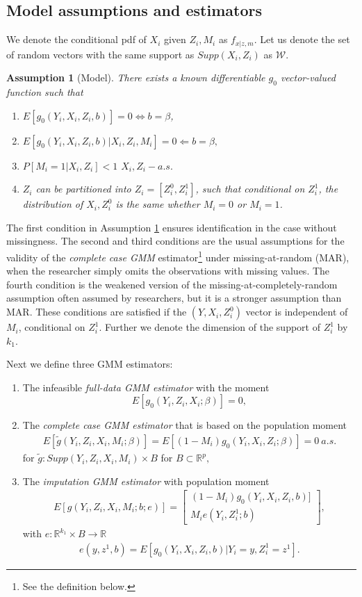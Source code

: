 \documentclass{article}
\newtheorem{assumption}{Assumption}
\theoremstyle{definition}
\theoremstyle{remark}
\begin{document}
\subsection{Model assumptions and estimators}
We denote the conditional pdf of $X_i$ given $Z_i, M_i$ as $f_{x|z,m}$. Let us denote the set of random vectors with the same support as $Supp(X_i,Z_i)$ as $\mathcal{W}$.
\begin{assumption}[Model] \label{ass_model}
There exists a known differentiable $g_0$ vector-valued function such that
\begin{enumerate}
\item $E[g_0(Y_i,X_i, Z_i, b)] = 0 \iff b=\beta$,
\item $E[g_0(Y_i, X_i, Z_i, b)|X_i, Z_i, M_i] = 0 \Leftarrow b=\beta,$
\item $P[M_i=1|X_i,Z_i]<1$ $X_i,Z_i-a.s.$
\item $Z_i$ can be partitioned into $Z_i= [Z^0_i, Z^1_i]$, such that conditional on $Z_i^1$, the distribution of $X_i, Z^0_i$ is the same whether $M_i=0$ or $M_i=1$.
\end{enumerate}
\end{assumption}
The first condition in Assumption \ref{ass_model} ensures identification in the case without missingness. The second and third conditions are the usual assumptions for the validity of the \textit{complete case GMM} estimator\footnote{See the definition below.} under missing-at-random (MAR), when the researcher simply omits the observations with missing values. The fourth condition is the weakened version of the missing-at-completely-random assumption often assumed by researchers, but it is a stronger assumption than MAR. These conditions are satisfied if the $(Y,X_i,Z^0_i)$ vector is independent of $M_i$, conditional on $Z_i^1$. Further we denote the dimension of the support of $Z^1_i$ by $k_1$.

Next we define three GMM estimators: 
\begin{enumerate}
	\item The infeasible \emph{full-data GMM estimator} with the moment
	\[E[g_0(Y_i, Z_i, X_i; \beta)]=0,
	\]
	\item The \emph{complete case GMM estimator} that is based on the population moment
	\begin{align}
	E[\tilde{g}(Y_i, Z_i, X_i, M_i; \beta)] = E\left[(1-M_i) g_0(Y_i, X_i,Z_i; \beta )\right]=0 \ a.s.
	\end{align}
	for $\tilde{g}: Supp(Y_i, Z_i, X_i, M_i) \times B$ for $B \subset \mathbb{R}^p,$
	\item The \emph{imputation GMM estimator} with population moment
	\begin{align}
	E[g(Y_i,Z_i,X_i,M_i; b; e)]=\left[\begin{array}{c}
	(1-M_i) g_0(Y_i,X_i,Z_i,b)]\\
	M_i e(Y_i, Z_i^1; b)
	\end{array}\right],
	\end{align}
	with $e: \mathbb{R}^{k_1}\times B \rightarrow \mathbb{R}$
	\begin{align}
	e(y, z^1,b)= E[g_0(Y_i, X_i,Z_i, b)|Y_i=y, Z_i^1=z^1].
	\end{align}
\end{enumerate}
\end{document}
